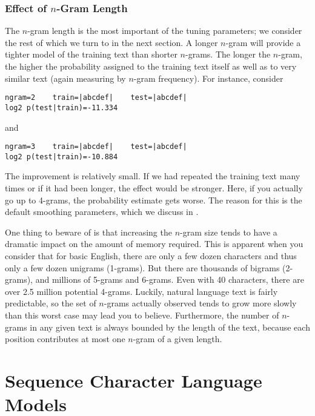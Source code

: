 \subsubsection{Effect of $n$-Gram Length}

The $n$-gram length is the most important of the tuning parameters; we
consider the rest of which we turn to in the next section.  A longer
$n$-gram will provide a tighter model of the training text than
shorter $n$-grams.  The longer the $n$-gram, the higher the
probability assigned to the training text itself as well as to very
similar text (again measuring by $n$-gram frequency).  For instance,
consider

\begin{verbatim}
ngram=2    train=|abcdef|    test=|abcdef|
log2 p(test|train)=-11.334
\end{verbatim}

and

\begin{verbatim}
ngram=3    train=|abcdef|    test=|abcdef|
log2 p(test|train)=-10.884
\end{verbatim}

The improvement is relatively small.  If we had repeated the training
text many times or if it had been longer, the effect would be
stronger.  Here, if you actually go up to 4-grams, the probability
estimate gets worse.  The reason for this is the default smoothing
parameters, which we discuss in .

One thing to beware of is that increasing the $n$-gram size tends to
have a dramatic impact on the amount of memory required.  This is
apparent when you consider that for basic English, there are only a
few dozen characters and thus only a few dozen unigrams (1-grams).
But there are thousands of bigrams (2-grams), and millions of 5-grams
and 6-grams.  Even with 40 characters, there are over 2.5 million
potential 4-grams.  Luckily, natural language text is fairly
predictable, so the set of $n$-grams actually observed tends to grow
more slowly than this worst case may lead you to believe.
Furthermore, the number of $n$-grams in any given text is always
bounded by the length of the text, because each position contributes
at most one $n$-gram of a given length.


\section{Sequence Character Language Models}

